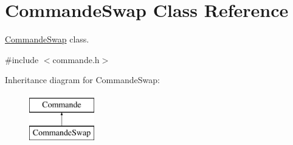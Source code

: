 \hypertarget{class_commande_swap}{\section{Commande\-Swap Class Reference}
\label{class_commande_swap}
}


\hyperlink{class_commande_swap}{Commande\-Swap} class.  




{\ttfamily \#include $<$commande.\-h$>$}

Inheritance diagram for Commande\-Swap\-:\begin{figure}[H]
\begin{center}
\leavevmode
\includegraphics[height=2.000000cm]{class_commande_swap}
\end{center}
\end{figure}
